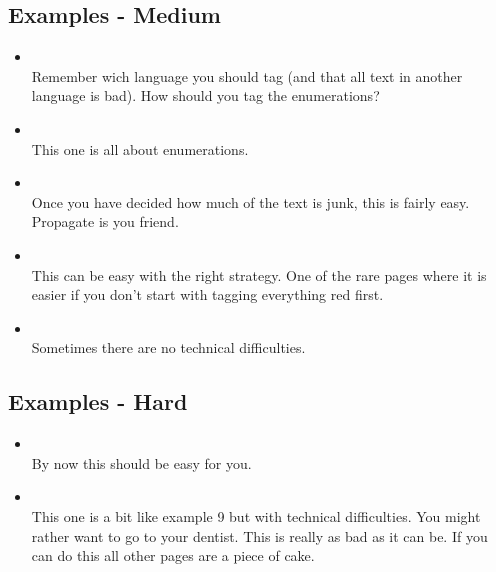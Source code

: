 \documentclass[12pt]{article}
\begin{document}
\subsection{Examples - Medium}
\begin{itemize}
\item {} \\
Remember wich language you should tag (and that all text in another language is bad). How should you tag the enumerations?

\item {} \\
This one is all about enumerations.

\item {} \\
Once you have decided how much of the text is junk, this is fairly easy. Propagate is you friend.

\item {} \\
This can be easy with the right strategy. One of the rare pages where it is easier if you don't start with tagging everything red first.

\item {} \\
Sometimes there are no technical difficulties.

\end{itemize}

\subsection{Examples - Hard}
\begin{itemize}
% 
\item {}\\
By now this should be easy for you. 

\item {} \\
This one is a bit like example 9 but with technical difficulties. You might rather want to go to your dentist. This is really as bad as it can be. If you can do this all other pages are a piece of cake.

\end{itemize}
\end{document}

